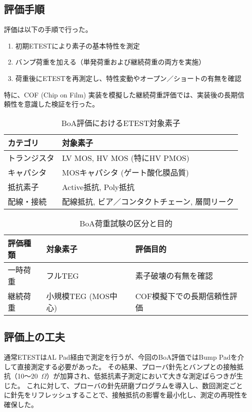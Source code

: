 \documentclass[conference]{IEEEtran}
\begin{document}
\subsection{評価手順}
評価は以下の手順で行った。
\begin{enumerate}
  \item 初期ETESTにより素子の基本特性を測定
  \item バンプ荷重を加える（単発荷重および継続荷重の両方を実施）
  \item 荷重後にETESTを再測定し、特性変動やオープン／ショートの有無を確認
\end{enumerate}
特に、COF (Chip on Film) 実装を模擬した継続荷重評価では、実装後の長期信頼性を意識した検証を行った。

\begin{table}[htbp]
\centering
\caption{BoA評価におけるETEST対象素子}
\label{tab:etest_devices}
\begin{tabular}{|l|l|}
\hline
カテゴリ & 対象素子 \\
\hline
トランジスタ & LV MOS, HV MOS (特にHV PMOS) \\
キャパシタ   & MOSキャパシタ (ゲート酸化膜品質) \\
抵抗素子     & Active抵抗, Poly抵抗 \\
配線・接続   & 配線抵抗, ビア／コンタクトチェーン, 層間リーク \\
\hline
\end{tabular}
\end{table}

\begin{table}[htbp]
\centering
\caption{BoA荷重試験の区分と目的}
\label{tab:load_test}
\begin{tabular}{|l|l|l|}
\hline
評価種類 & 対象素子 & 評価目的 \\
\hline
一時荷重 & フルTEG & 素子破壊の有無を確認 \\
継続荷重 & 小規模TEG (MOS中心) & COF模擬下での長期信頼性評価 \\
\hline
\end{tabular}
\end{table}

\subsection{評価上の工夫}
通常ETESTはAL Pad経由で測定を行うが、今回のBoA評価ではBump Padを介して直接測定する必要があった。  
その結果、プローバ針先とバンプとの接触抵抗（10〜20~$\Omega$）が加算され、低抵抗素子測定において大きな測定ばらつきが生じた。  
これに対して、プローバの針先研磨プログラムを導入し、数回測定ごとに針先をリフレッシュすることで、接触抵抗の影響を最小化し、測定の再現性を確保した。
\end{document}
